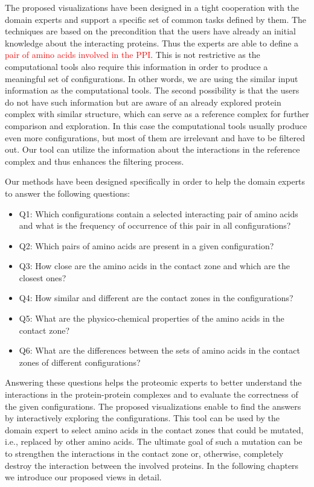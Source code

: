 \documentclass{bmcart}
\begin{document}
The proposed visualizations have been designed in a tight cooperation with the domain experts and support a specific set of common tasks defined by them.
The techniques are based on the precondition that the users have already an initial knowledge about the interacting proteins.
Thus the experts are able to define a \textcolor{red}{pair of amino acids involved in the PPI}.
This is not restrictive as the computational tools also require this information in order to produce a meaningful set of configurations. 
In other words, we are using the similar input information as the computational tools.
The second possibility is that the users do not have such information but are aware of an already explored protein complex with similar structure, which can serve as a reference complex for further comparison and exploration. 
In this case the computational tools usually produce even more configurations, but most of them are irrelevant and have to be filtered out. 
Our tool can utilize the information about the interactions in the reference complex and thus enhances the filtering process.

Our methods have been designed specifically in order to help the domain experts to answer the following questions:
\begin{itemize}
\item Q1: Which configurations contain a selected interacting pair of amino acids and what is the frequency of occurrence of this pair in all configurations?
\item Q2: Which pairs of amino acids are present in a given configuration?
\item Q3: How close are the amino acids in the contact zone and which are the closest ones?
\item Q4: How similar and different are the contact zones in the configurations?
\item Q5: What are the physico-chemical properties of the amino acids in the contact zone?
\item Q6: What are the differences between the sets of amino acids in the contact zones of different configurations?
\end{itemize}

Answering these questions helps the proteomic experts to better understand the interactions in the protein-protein complexes and to evaluate the correctness of the given configurations.
The proposed visualizations enable to find the answers by interactively exploring the configurations.
This tool can be used by the domain expert to select amino acids in the contact zones that could be mutated, i.e., replaced by other amino acids.
The ultimate goal of such a mutation can be to strengthen the interactions in the contact zone or, otherwise, completely destroy the interaction between the involved proteins. 
In the following chapters we introduce our proposed views in detail.
\end{document}
